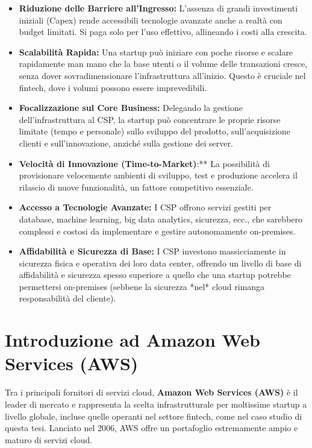 \begin{itemize}
    \item \textbf{Riduzione delle Barriere all'Ingresso:} L'assenza di grandi investimenti iniziali (Capex) rende accessibili tecnologie avanzate anche a realtà con budget limitati. Si paga solo per l'uso effettivo, allineando i costi alla crescita.
    \item \textbf{Scalabilità Rapida:} Una startup può iniziare con poche risorse e scalare rapidamente man mano che la base utenti o il volume delle transazioni cresce, senza dover sovradimensionare l'infrastruttura all'inizio. Questo è cruciale nel fintech, dove i volumi possono essere imprevedibili.
    \item \textbf{Focalizzazione sul Core Business:} Delegando la gestione dell'infrastruttura al CSP, la startup può concentrare le proprie risorse limitate (tempo e personale) sullo sviluppo del prodotto, sull'acquisizione clienti e sull'innovazione, anziché sulla gestione dei server.
    \item \textbf{Velocità di Innovazione (Time-to-Market)}:** La possibilità di provisionare velocemente ambienti di sviluppo, test e produzione accelera il rilascio di nuove funzionalità, un fattore competitivo essenziale.
    \item \textbf{Accesso a Tecnologie Avanzate:} I CSP offrono servizi gestiti per database, machine learning, big data analytics, sicurezza, ecc., che sarebbero complessi e costosi da implementare e gestire autonomamente on-premises.
    \item \textbf{Affidabilità e Sicurezza di Base:} I CSP investono massicciamente in sicurezza fisica e operativa dei loro data center, offrendo un livello di base di affidabilità e sicurezza spesso superiore a quello che una startup potrebbe permettersi on-premises (sebbene la sicurezza *nel* cloud rimanga responsabilità del cliente).
\end{itemize}
\section{Introduzione ad Amazon Web Services (AWS)}
\label{sec:aws-intro}

Tra i principali fornitori di servizi cloud, \textbf{Amazon Web Services (AWS)} è il leader di mercato e rappresenta la scelta infrastrutturale per moltissime startup a livello globale, incluse quelle operanti nel settore fintech, come nel caso studio di questa tesi. Lanciato nel 2006, AWS offre un portafoglio estremamente ampio e maturo di servizi cloud.

